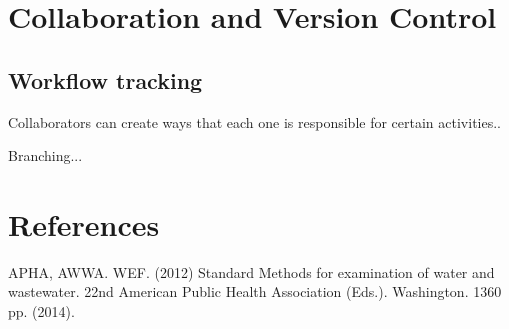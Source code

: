 \documentclass[12pt]{../SOP3_beta}
\begin{document}

\section{Collaboration and Version Control}

\subsection{Workflow tracking}

\NP Collaborators can create ways that each one is responsible for certain activities..

\NP Branching...


\section{References}

\NP APHA, AWWA. WEF. (2012) Standard Methods for examination of water and wastewater. 22nd American Public Health Association (Eds.). Washington. 1360 pp. (2014).
\end{document}
